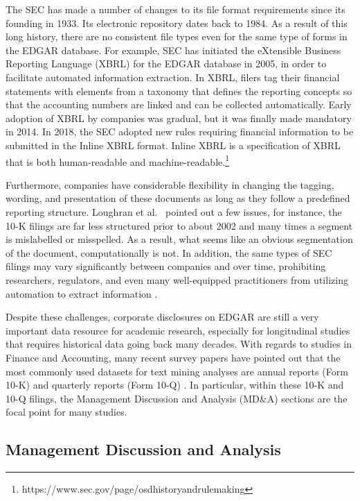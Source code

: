 The SEC has made a number of changes to its file format requirements since its founding in 1933. Its electronic repository dates back to 1984. As a result of this long history, there are no consistent file types even for the same type of forms in the EDGAR database. For example, SEC has initiated the eXtensible Business Reporting Language (XBRL) for the EDGAR database in 2005, in order to facilitate automated information extraction. In XBRL, filers tag their financial statements with elements from a taxonomy that defines the reporting concepts so that the accounting numbers are linked and can be collected automatically. Early adoption of XBRL by companies was gradual, but it was finally made mandatory in 2014. In 2018, the SEC adopted new rules requiring financial information to be submitted in the Inline XBRL format. Inline XBRL is a specification of XBRL that is both human-readable and machine-readable.\footnote {https://www.sec.gov/page/osdhistoryandrulemaking} 

Furthermore, companies have considerable flexibility in changing the tagging, wording, and presentation of these documents as long as they follow a predefined reporting structure. Loughran et al.~\cite{Loughran2016} pointed out a few issues, for instance, the 10-K filings are far less structured prior to about 2002 and many times a segment is mislabelled or misspelled. As a result, what seems like an obvious segmentation of the document, computationally is not. In addition, the same types of SEC filings may vary significantly between companies and over time, prohibiting researchers, regulators, and even many well-equipped practitioners from utilizing automation to extract information \cite{lazyprices2020}.

Despite these challenges, corporate disclosures on EDGAR are still a very important data resource for academic research, especially for longitudinal studies that requires historical data going back many decades. With regards to studies in Finance and Accounting, many recent survey papers have pointed out that the most commonly used datasets for text mining analyses are annual reports (Form 10-K) and quarterly reports (Form 10-Q) \cite{Tueregun2019, Gupta2020, Ravula2020}. In particular, within these 10-K and 10-Q filings, the Management Discussion and Analysis (MD\&A) sections are the focal point for many studies.

\subsection{Management Discussion and Analysis}

